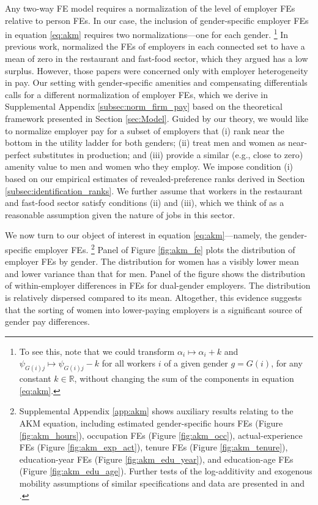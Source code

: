 Any two-way FE model requires a normalization of the level of employer FEs relative to person FEs. In our case, the inclusion of gender-specific employer FEs in equation \eqref{eq:akm} requires two normalizations---one for each gender.%
%
\footnote{To see this, note that we could transform $\alpha_{i} \mapsto \alpha_{i} + k$ and $\psi_{G(i)j} \mapsto \psi_{G(i)j} - k$ for all workers $i$ of a given gender $g = G(i)$, for any constant $k \in \mathbb{R}$, without changing the sum of the components in equation \eqref{eq:akm}.} %
%
In previous work, \citet{CardCardosoKline2016} normalized the FEs of employers in each connected set to have a mean of zero in the restaurant and fast-food sector, which they argued has a low surplus. However, those papers were concerned only with employer heterogeneity in pay. Our setting with gender-specific amenities and compensating differentials calls for a different normalization of employer FEs, which we derive in Supplemental Appendix \ref{subsec:norm_firm_pay} based on the theoretical framework presented in Section \ref{sec:Model}. Guided by our theory, we would like to normalize employer pay for a subset of employers that (i) rank near the bottom in the utility ladder for both genders; (ii) treat men and women as near-perfect substitutes in production; and (iii) provide a similar (e.g., close to zero) amenity value to men and women who they employ. We impose condition (i) based on our empirical estimates of revealed-preference ranks derived in Section \ref{subsec:identification_ranks}. We further assume that workers in the restaurant and fast-food sector satisfy conditions (ii) and (iii), which we think of as a reasonable assumption given the nature of jobs in this sector.

We now turn to our object of interest in equation \eqref{eq:akm}---namely, the gender-specific employer FEs.%
%
\footnote{Supplemental Appendix \ref{app:akm} shows auxiliary results relating to the AKM equation, including estimated gender-specific hours FEs (Figure \ref{fig:akm_hours}), occupation FEs (Figure \ref{fig:akm_occ}), actual-experience FEs (Figure \ref{fig:akm_exp_act}), tenure FEs (Figure \ref{fig:akm_tenure}), education-year FEs (Figure \ref{fig:akm_edu_year}), and education-age FEs (Figure \ref{fig:akm_edu_age}). Further tests of the log-additivity and exogenous mobility assumptions of similar specifications and data are presented in \citet{AlvarezBenguriaEngbomMoser2018} and \citet{EngbomMoser2022a}.} %
%
Panel  of Figure \ref{fig:akm_fe} plots the distribution of employer FEs by gender. The distribution for women has a visibly lower mean and lower variance than that for men. Panel  of the figure shows the distribution of within-employer differences in FEs for dual-gender employers. The distribution is relatively dispersed compared to its mean. Altogether, this evidence suggests that the sorting of women into lower-paying employers is a significant source of gender pay differences.

